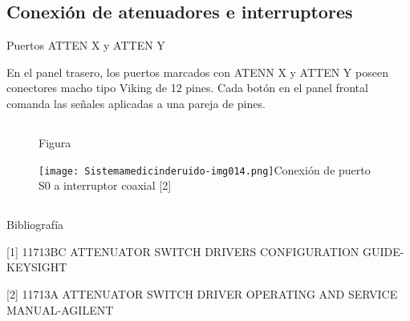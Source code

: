 \documentclass[paper=letter,oneside,fontsize=10pt,parskip=full]{article}
\begin{document}
\subsection{Conexión de atenuadores e interruptores}
Puertos ATTEN X y ATTEN Y

En el panel trasero, los puertos marcados con ATENN X y ATTEN Y poseen conectores macho tipo Viking de 12 pines. Cada
botón en el panel frontal comanda las señales aplicadas a una pareja de pines.

\subsection{}
\subsection{}

\bigskip


\bigskip


\bigskip


\bigskip

\subsection{}


\begin{figure}
\centering
\begin{minipage}{11.456cm}
Figura

\texttt{[image: Sistemamedicinderuido-img014.png]}Conexión de puerto S0 a interruptor coaxial [2]
\end{minipage}
\end{figure}
\subsection{}

\bigskip


\bigskip


\bigskip


\bigskip

Bibliografía

[1] 11713BC ATTENUATOR SWITCH DRIVERS CONFIGURATION GUIDE-KEYSIGHT

[2] 11713A ATTENUATOR SWITCH DRIVER OPERATING AND SERVICE MANUAL-AGILENT


\bigskip


\bigskip


\bigskip

\subsection{}
\end{document}
